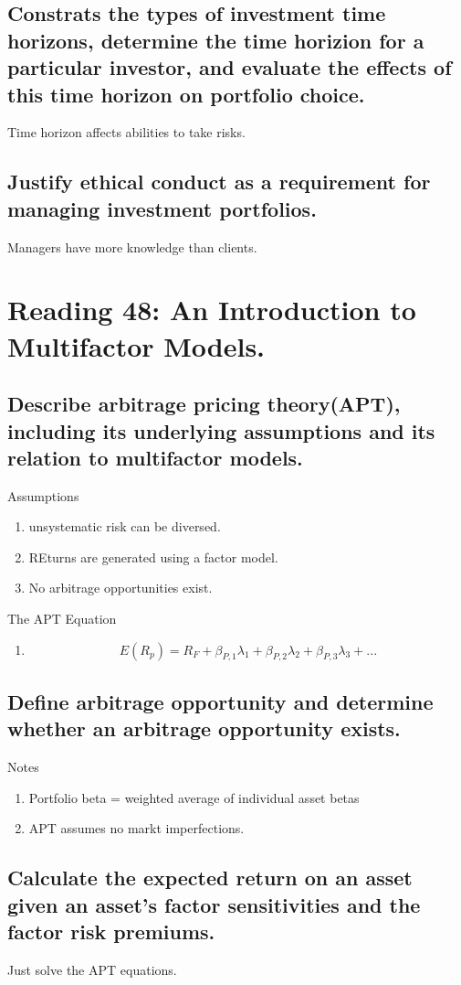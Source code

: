 \documentclass{article}
\newcommand{\be}{\begin{enumerate}}
\newcommand{\ee}{\end{enumerate}}
\begin{document}
\subsection{Constrats the types of investment time horizons, determine the time
horizion for a particular investor, and evaluate the effects of this time horizon on portfolio choice.}
Time horizon affects abilities to take risks.
\subsection{Justify ethical conduct as a requirement for managing investment portfolios.}
Managers have more knowledge than clients.




\section{Reading 48: An Introduction to Multifactor Models.}
\subsection{Describe arbitrage pricing theory(APT), including its underlying assumptions 
and its relation to multifactor models.}
Assumptions
\be
    \item unsystematic risk can be diversed.
    \item REturns are generated using a factor model.
    \item No arbitrage opportunities exist.
\ee
The APT Equation
\be
    \item $$
            E(R_p)=R_F+\beta_{P,1}\lambda_1+\beta_{P,2}\lambda_2+\beta_{P,3}\lambda_3+...
            $$
\ee
\subsection{Define arbitrage opportunity and determine whether an arbitrage opportunity exists.}
Notes
\be
    \item Portfolio beta = weighted average of individual asset betas
    \item APT assumes no markt imperfections.
\ee
\subsection{Calculate the expected return on an asset given an asset's factor
sensitivities and the factor risk premiums.}
Just solve the APT equations.
\end{document}
